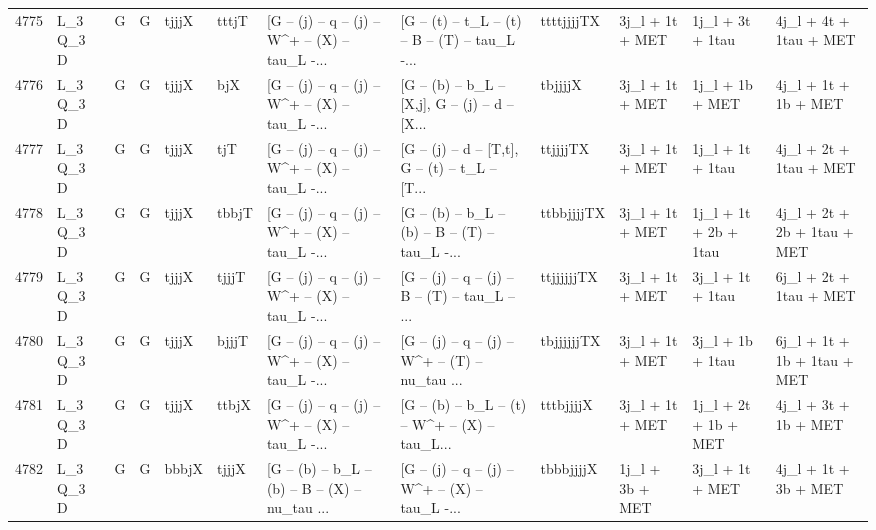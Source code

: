 \begin{tabular}{llllllllllll}
4775 &    L\_3 Q\_3 D &     G &     G &       tjjjX &       tttjT &  [G -- (j) -- q -- (j) -- W\textasciicircum + -- (X) -- tau\_L -... &  [G -- (t) -- t\_L -- (t) -- B -- (T) -- tau\_L -... &  ttttjjjjTX &          3j\_l + 1t + MET &         1j\_l + 3t + 1tau &             4j\_l + 4t + 1tau + MET \\
4776 &    L\_3 Q\_3 D &     G &     G &       tjjjX &         bjX &  [G -- (j) -- q -- (j) -- W\textasciicircum + -- (X) -- tau\_L -... &  [G -- (b) -- b\_L -- [X,j], G -- (j) -- d -- [X... &     tbjjjjX &          3j\_l + 1t + MET &          1j\_l + 1b + MET &               4j\_l + 1t + 1b + MET \\
4777 &    L\_3 Q\_3 D &     G &     G &       tjjjX &         tjT &  [G -- (j) -- q -- (j) -- W\textasciicircum + -- (X) -- tau\_L -... &  [G -- (j) -- d -- [T,t], G -- (t) -- t\_L -- [T... &    ttjjjjTX &          3j\_l + 1t + MET &         1j\_l + 1t + 1tau &             4j\_l + 2t + 1tau + MET \\
4778 &    L\_3 Q\_3 D &     G &     G &       tjjjX &       tbbjT &  [G -- (j) -- q -- (j) -- W\textasciicircum + -- (X) -- tau\_L -... &  [G -- (b) -- b\_L -- (b) -- B -- (T) -- tau\_L -... &  ttbbjjjjTX &          3j\_l + 1t + MET &    1j\_l + 1t + 2b + 1tau &        4j\_l + 2t + 2b + 1tau + MET \\
4779 &    L\_3 Q\_3 D &     G &     G &       tjjjX &       tjjjT &  [G -- (j) -- q -- (j) -- W\textasciicircum + -- (X) -- tau\_L -... &  [G -- (j) -- q -- (j) -- B -- (T) -- tau\_L -- ... &  ttjjjjjjTX &          3j\_l + 1t + MET &         3j\_l + 1t + 1tau &             6j\_l + 2t + 1tau + MET \\
4780 &    L\_3 Q\_3 D &     G &     G &       tjjjX &       bjjjT &  [G -- (j) -- q -- (j) -- W\textasciicircum + -- (X) -- tau\_L -... &  [G -- (j) -- q -- (j) -- W\textasciicircum + -- (T) -- nu\_tau ... &  tbjjjjjjTX &          3j\_l + 1t + MET &         3j\_l + 1b + 1tau &        6j\_l + 1t + 1b + 1tau + MET \\
4781 &    L\_3 Q\_3 D &     G &     G &       tjjjX &       ttbjX &  [G -- (j) -- q -- (j) -- W\textasciicircum + -- (X) -- tau\_L -... &  [G -- (b) -- b\_L -- (t) -- W\textasciicircum + -- (X) -- tau\_L... &   tttbjjjjX &          3j\_l + 1t + MET &     1j\_l + 2t + 1b + MET &               4j\_l + 3t + 1b + MET \\
4782 &    L\_3 Q\_3 D &     G &     G &       bbbjX &       tjjjX &  [G -- (b) -- b\_L -- (b) -- B -- (X) -- nu\_tau ... &  [G -- (j) -- q -- (j) -- W\textasciicircum + -- (X) -- tau\_L -... &   tbbbjjjjX &          1j\_l + 3b + MET &          3j\_l + 1t + MET &               4j\_l + 1t + 3b + MET \\

\end{tabular}
